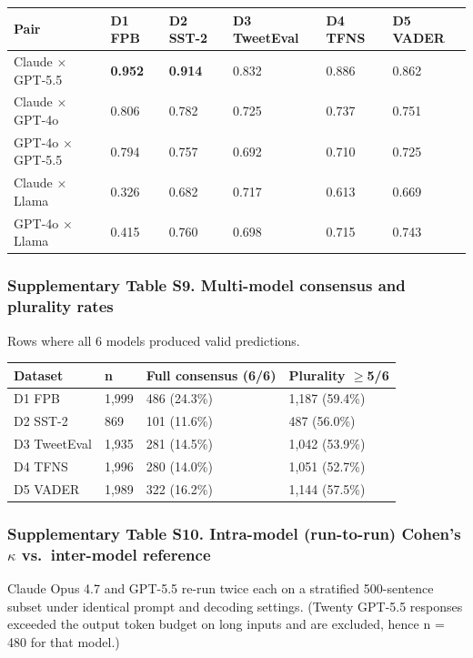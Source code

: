 \documentclass[11pt]{article}
\begin{document}
\begin{longtable}[]{@{}llllll@{}}
\toprule\noalign{}
Pair & D1 FPB & D2 SST-2 & D3 TweetEval & D4 TFNS & D5 VADER \\
\midrule\noalign{}
\endhead
\bottomrule\noalign{}
\endlastfoot
Claude $\times$ GPT-5.5 & \textbf{0.952} & \textbf{0.914} & 0.832 & 0.886 &
0.862 \\
Claude $\times$ GPT-4o & 0.806 & 0.782 & 0.725 & 0.737 & 0.751 \\
GPT-4o $\times$ GPT-5.5 & 0.794 & 0.757 & 0.692 & 0.710 & 0.725 \\
Claude $\times$ Llama & 0.326 & 0.682 & 0.717 & 0.613 & 0.669 \\
GPT-4o $\times$ Llama & 0.415 & 0.760 & 0.698 & 0.715 & 0.743 \\
\end{longtable}

\subsubsection{Supplementary Table S9. Multi-model consensus and
plurality
rates}\label{supplementary-table-s9.-multi-model-consensus-and-plurality-rates}

Rows where all 6 models produced valid predictions.

\begin{longtable}[]{@{}llll@{}}
\toprule\noalign{}
Dataset & n & Full consensus (6/6) & Plurality $\geq$5/6 \\
\midrule\noalign{}
\endhead
\bottomrule\noalign{}
\endlastfoot
D1 FPB & 1,999 & 486 (24.3\%) & 1,187 (59.4\%) \\
D2 SST-2 & 869 & 101 (11.6\%) & 487 (56.0\%) \\
D3 TweetEval & 1,935 & 281 (14.5\%) & 1,042 (53.9\%) \\
D4 TFNS & 1,996 & 280 (14.0\%) & 1,051 (52.7\%) \\
D5 VADER & 1,989 & 322 (16.2\%) & 1,144 (57.5\%) \\
\end{longtable}

\subsubsection{Supplementary Table S10. Intra-model (run-to-run) Cohen's
$\kappa$ vs.~inter-model
reference}\label{supplementary-table-s10.-intra-model-run-to-run-cohens-ux3ba-vs.-inter-model-reference}

Claude Opus 4.7 and GPT-5.5 re-run twice each on a stratified
500-sentence subset under identical prompt and decoding settings.
(Twenty GPT-5.5 responses exceeded the output token budget on long
inputs and are excluded, hence n = 480 for that model.)
\end{document}

